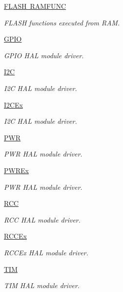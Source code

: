 \begin{DoxyCompactItemize}
\mbox{\hyperlink{group___f_l_a_s_h___r_a_m_f_u_n_c}{F\+L\+A\+S\+H R\+A\+M\+F\+U\+NC}}
\begin{DoxyCompactList}\small\item\em F\+L\+A\+SH functions executed from R\+AM. \end{DoxyCompactList}\item 
\mbox{\hyperlink{group___g_p_i_o}{G\+P\+IO}}
\begin{DoxyCompactList}\small\item\em G\+P\+IO H\+AL module driver. \end{DoxyCompactList}\item 
\mbox{\hyperlink{group___i2_c}{I2C}}
\begin{DoxyCompactList}\small\item\em I2C H\+AL module driver. \end{DoxyCompactList}\item 
\mbox{\hyperlink{group___i2_c_ex}{I2\+C\+Ex}}
\begin{DoxyCompactList}\small\item\em I2C H\+AL module driver. \end{DoxyCompactList}\item 
\mbox{\hyperlink{group___p_w_r}{P\+WR}}
\begin{DoxyCompactList}\small\item\em P\+WR H\+AL module driver. \end{DoxyCompactList}\item 
\mbox{\hyperlink{group___p_w_r_ex}{P\+W\+R\+Ex}}
\begin{DoxyCompactList}\small\item\em P\+WR H\+AL module driver. \end{DoxyCompactList}\item 
\mbox{\hyperlink{group___r_c_c}{R\+CC}}
\begin{DoxyCompactList}\small\item\em R\+CC H\+AL module driver. \end{DoxyCompactList}\item 
\mbox{\hyperlink{group___r_c_c_ex}{R\+C\+C\+Ex}}
\begin{DoxyCompactList}\small\item\em R\+C\+C\+Ex H\+AL module driver. \end{DoxyCompactList}\item 
\mbox{\hyperlink{group___t_i_m}{T\+IM}}
\begin{DoxyCompactList}\small\item\em T\+IM H\+AL module driver. \end{DoxyCompactList}\item 

\end{DoxyCompactItemize}
